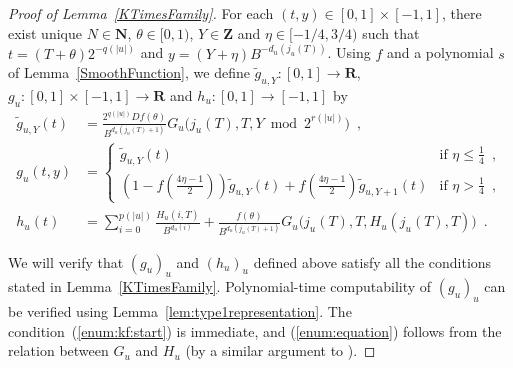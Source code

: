 \documentclass[12pt,a4paper]{article}
\theoremstyle{definition}
\theoremstyle{remark}
\newcommand{\R}{\mathbf R}
\newcommand{\N}{\mathbf N}
\newcommand{\Z}{\mathbf Z}
\newcommand{\D}{D}
\begin{document}
\begin{proof}[Proof of Lemma~\ref{KTimesFamily}]
For each $(t, y) \in [0,1] \times [-1, 1]$,
there exist unique $N \in \N$, $\theta \in [0,1)$, $Y \in \Z$ and $\eta \in [-1/4, 3/4)$
such that $t = (T + \theta)2^{-q(|u|)}$ and $y = (Y + \eta)B^{-d_u(j_u(T))}$.
Using $f$ and a polynomial $s$ of Lemma~\ref{SmoothFunction},
we define 
$\tilde g_{u,Y} \colon [0,1] \to \R$,
$
g _u \colon [0, 1] \times [-1, 1] \to \R
$ and $
h _u \colon [0, 1] \to [-1, 1]
$ by
  \begin{align}
    \label{eq:delta}
   \tilde g_{u, Y} (t) &= \frac{2^{q(|u|)} \D f(\theta)}{B^{d_u(j_u(T)+1)}} 
   G_u \bigl( j_u(T), T, Y \bmod 2^{r(|u|)} \bigr) \enspace ,
   \\
  \label{eq:gu}
  g_u(t,y) 
  &= \begin{cases}
     \tilde g_{u, Y}(t)
     & \text{if } \eta \le \frac{1}{4} \enspace , 
     \\
     ( 1-f ( \frac{4\eta-1}{2})) \tilde g_{u, Y}(t)
     + f ( \frac{4\eta-1}{2}) \tilde g_{u,Y+1}(t)
     & \text{if } \eta > \frac{1}{4} \enspace ,
    \end{cases}
   \\
  h_u(t) 
   &= \sum^{p(|u|)}_{i=0} \frac{H_u(i, T)}{B^{d_u(i)}}  
  + \frac{f(\theta)}{B^{d_u(j_u(T)+1)}} G_u \bigl( j_u(T), T, H_u(j_u(T), T) \bigr)  \enspace .
  \label{eq:hu}
  \end{align}

We will verify that $(g_u)_u$ and $(h_u)_u$ defined above satisfy all the conditions stated in Lemma~\ref{KTimesFamily}.
Polynomial-time computability of $(g_u)_u$ can be verified using Lemma~\ref{lem:type1representation}.
The condition~(\ref{enum:kf:start}) is immediate, 
and (\ref{enum:equation}) follows from the relation between $G _u$ and $H _u$ 
(by a similar argument to \cite[Lemma 4.1]{kawamura2010lipschitz}).


\end{proof}
\end{document}

